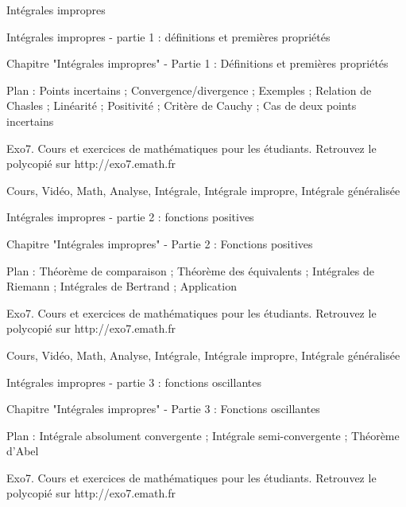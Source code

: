
   Intégrales impropres




Intégrales impropres - partie 1 : définitions et premières propriétés


\video{}

Chapitre "Intégrales impropres" - Partie 1 : Définitions et premières propriétés

Plan : Points incertains ; Convergence/divergence ; Exemples ; Relation de Chasles ;
Linéarité ; Positivité ; Critère de Cauchy ; Cas de deux points incertains

Exo7. Cours et exercices de mathématiques pour les étudiants.
Retrouvez le polycopié sur http://exo7.emath.fr


Cours, Vidéo, Math, Analyse, Intégrale, Intégrale impropre, Intégrale généralisée




Intégrales impropres - partie 2 : fonctions positives


\video{}

Chapitre "Intégrales impropres" - Partie 2 : Fonctions positives

Plan : Théorème de comparaison ; Théorème des équivalents ;
Intégrales de Riemann ; Intégrales de Bertrand ; Application

Exo7. Cours et exercices de mathématiques pour les étudiants.
Retrouvez le polycopié sur http://exo7.emath.fr


Cours, Vidéo, Math, Analyse, Intégrale, Intégrale impropre, Intégrale généralisée



Intégrales impropres - partie 3 : fonctions oscillantes


\video{}

Chapitre "Intégrales impropres" - Partie 3 : Fonctions oscillantes

Plan : Intégrale absolument convergente ; Intégrale semi-convergente ;
Théorème d'Abel

Exo7. Cours et exercices de mathématiques pour les étudiants.
Retrouvez le polycopié sur http://exo7.emath.fr

